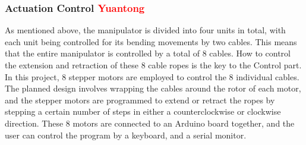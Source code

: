 \subsubsection{Actuation Control \textcolor{red}{Yuantong}}
As mentioned above, the manipulator is divided into four units in total, with each unit being controlled for its 
bending movements by two cables. This means that the entire manipulator is controlled by a total of 8 cables. How 
to control the extension and retraction of these 8 cable ropes is the key to the Control part. \\
In this project, 8 stepper motors are employed to control the 8 individual cables. The planned design involves 
wrapping the cables around the rotor of each motor, and the stepper motors are programmed to extend or retract 
the ropes by stepping a certain number of steps in either a counterclockwise or clockwise direction. These 8 motors 
are connected to an Arduino board together, and the user can control the program by a keyboard, and a serial monitor. \\
